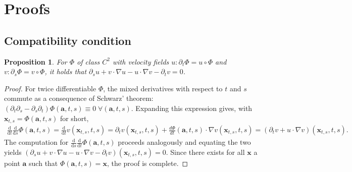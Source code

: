 \documentclass{article}
\newcommand{\bfx}{\boldsymbol{x}}
\newcommand{\bfa}{\boldsymbol{a}}
\theoremstyle{definition}
\theoremstyle{plain}
\newtheorem{proposition}[theorem]{Proposition}
\theoremstyle{definition}
\theoremstyle{remark}
\newcommand{\Flow}{\Phi}
\begin{document}
\section{Proofs}
\subsection{Compatibility condition}
\begin{proposition}
    For $\Flow$ of class $C^2$ with velocity fields $u: \partial_t \Flow = u \circ \Flow$ and $v: \partial_s \Flow = v \circ \Flow$, it holds that $\partial_s u + v \cdot \nabla u - u \cdot \nabla v - \partial_t v = 0$.
\end{proposition}

\begin{proof}
    For twice differentiable $\Flow$, the mixed derivatives with respect to $t$ and $s$ commute as a consequence of Schwarz' theorem: $\left( \partial_t \partial_s - \partial_s \partial_t \right) \Flow(\bfa, t, s) \equiv 0 \; \forall (\bfa, t, s)$.
    Expanding this expression gives, with $\bfx_{t,s} = \Flow(\bfa, t, s)$ for short,
    \begin{align}
        \frac{\mathrm d}{\mathrm d t} \frac{\mathrm d}{\mathrm d s} \Flow(\bfa, t, s)
        = \frac{\mathrm d}{\mathrm d t} v(\bfx_{t,s}, t, s) 
        = \partial_t v(\bfx_{t,s}, t, s) + \frac{d\Flow}{dt}(\bfa, t, s) \cdot \nabla v(\bfx_{t,s}, t, s)
        = (\partial_t v + u \cdot \nabla v)(\bfx_{t,s}, t, s).
    \end{align}
    The computation for $\frac{\mathrm d}{\mathrm d s} \frac{\mathrm d}{\mathrm d t} \Flow(\bfa, t, s)$ proceeds analogously and equating the two yields $(\partial_s u + v \cdot \nabla u - u \cdot \nabla v - \partial_t v)(\bfx_{t,s}, t, s) = 0$. Since there exists for all $\bfx$ a point $\bfa$ such that $\Flow(\bfa, t, s) = \bfx$, the proof is complete.
\end{proof}
\end{document}
